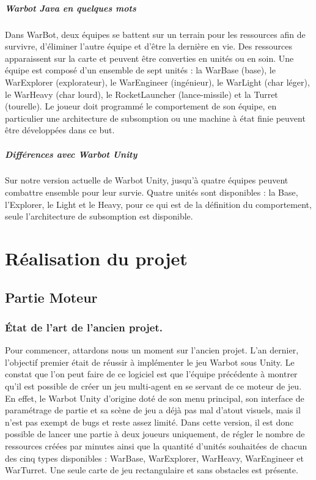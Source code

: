 \documentclass{report}
\begin{document}
\subsubsection{Warbot Java en quelques mots}
Dans WarBot, deux équipes se battent sur un terrain pour les ressources afin de survivre, d'éliminer l'autre équipe et d’être la dernière en vie. Des ressources apparaissent sur la carte et peuvent être converties en unités ou en soin.
\newline Une équipe est composé d'un ensemble de sept unités :  la WarBase (base), le WarExplorer (explorateur), le WarEngineer (ingénieur), le WarLight (char léger), le WarHeavy (char lourd), le RocketLauncher (lance-missile) et la Turret (tourelle). 
\newline Le joueur doit programmé le comportement de son équipe, en particulier une architecture de subsomption ou une machine à état finie peuvent être développées dans ce but.

\subsubsection{Différences avec Warbot Unity}
Sur notre version actuelle de Warbot Unity, jusqu'à quatre équipes peuvent combattre ensemble pour leur survie. Quatre unités sont disponibles : la Base, l'Explorer, le Light et le Heavy, pour ce qui est de la définition du comportement, seule l'architecture de subsomption est disponible.

\newpage
\part{Réalisation du projet}
\newpage

\chapter{Partie Moteur}

\section{État de l'art de l'ancien projet.}

Pour commencer, attardons nous un moment sur l'ancien projet. L'an dernier, l'objectif premier était de réussir à implémenter le jeu Warbot sous Unity. Le constat que l'on peut faire de ce logiciel est que l'équipe précédente à montrer qu'il est possible de créer un jeu multi-agent en se servant de ce moteur de jeu.
En effet, le Warbot Unity d'origine doté de son menu principal, son interface de paramétrage de partie et sa scène de jeu a déjà pas mal d'atout visuels, mais il n'est pas exempt de bugs et reste assez limité.
Dans cette version, il est donc possible de lancer une partie à deux joueurs uniquement, de régler le nombre de ressources créées par minutes ainsi que la quantité d'unités souhaitées de chacun des cinq types disponibles : WarBase, WarExplorer, WarHeavy, WarEngineer et WarTurret. Une seule carte de jeu rectangulaire et sans obstacles est présente. 
\end{document}
